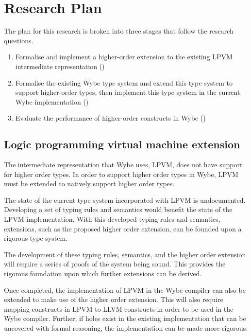 \clearpage

\def\chaptertitle{Research Plan}

\lhead{\emph{\chaptertitle}}

\chapter{\chaptertitle}
\label{ch:research-plan}

The plan for this research is broken into three stages that follow the research questions.

\begin{enumerate}
  \item Formalise and implement a higher-order extension to the existing LPVM intermediate representation ()
  \item Formalise the existing Wybe type system and extend this type system to support higher-order types, then implement this type system in the current Wybe implementation ()
  \item Evaluate the performance of higher-order constructs in Wybe ()
\end{enumerate}

\section{Logic programming virtual machine extension}
\label{sec:plan-lpvm}

The intermediate representation that Wybe uses, LPVM, does not have support for higher order types. In order to support higher order types in Wybe, LPVM must be extended to natively support higher order types.

The state of the current type system incorporated with LPVM is undocumented. Developing a set of typing rules and semantics would benefit the state of the LPVM implementation. With this developed typing rules and semantics, extensions, such as the proposed higher order extension, can be founded upon a rigorous type system. 

The development of these typing rules, semantics, and the higher order extension will require a series of proofs of the system being sound. This provides the rigorous foundation upon which further extensions can be derived.

Once completed, the implementation of LPVM in the Wybe compiler can also be extended to make use of the higher order extension. This will also require mapping constructs in LPVM to LLVM constructs in order to be used in the Wybe compiler. Further, if holes exist in the existing implementation that can be uncovered with formal reasoning, the implementation can be made more rigorous.

